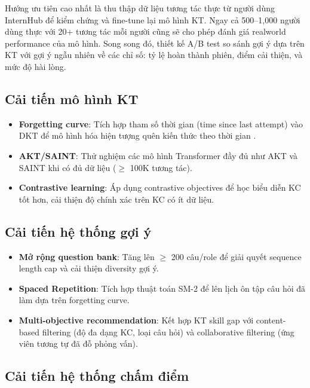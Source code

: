 Hướng ưu tiên cao nhất là thu thập dữ liệu tương tác thực từ người dùng InternHub để kiểm chứng và fine-tune lại mô hình KT. Ngay cả 500--1{,}000 người dùng thực với 20+ tương tác mỗi người cũng sẽ cho phép đánh giá realworld performance của mô hình. Song song đó, thiết kế A/B test so sánh gợi ý dựa trên KT với gợi ý ngẫu nhiên về các chỉ số: tỷ lệ hoàn thành phiên, điểm cải thiện, và mức độ hài lòng.

\subsection{Cải tiến mô hình KT}

\begin{itemize}
  \item \textbf{Forgetting curve}: Tích hợp tham số thời gian (time since last attempt) vào DKT để mô hình hóa hiện tượng quên kiến thức theo thời gian \cite{ebbinghaus1885memory}.
  \item \textbf{AKT/SAINT}: Thử nghiệm các mô hình Transformer đầy đủ như AKT \cite{ghosh2020context} và SAINT \cite{choi2020towards} khi có đủ dữ liệu ($\geq$ 100K tương tác).
  \item \textbf{Contrastive learning}: Áp dụng contrastive objectives để học biểu diễn KC tốt hơn, cải thiện độ chính xác trên KC có ít dữ liệu.
\end{itemize}

\subsection{Cải tiến hệ thống gợi ý}

\begin{itemize}
  \item \textbf{Mở rộng question bank}: Tăng lên $\geq$ 200 câu/role để giải quyết sequence length cap và cải thiện diversity gợi ý.
  \item \textbf{Spaced Repetition}: Tích hợp thuật toán SM-2 \cite{wozniak1990optimization} để lên lịch ôn tập câu hỏi đã làm dựa trên forgetting curve.
  \item \textbf{Multi-objective recommendation}: Kết hợp KT skill gap với content-based filtering (độ đa dạng KC, loại câu hỏi) và collaborative filtering (ứng viên tương tự đã đỗ phỏng vấn).
\end{itemize}

\subsection{Cải tiến hệ thống chấm điểm}

